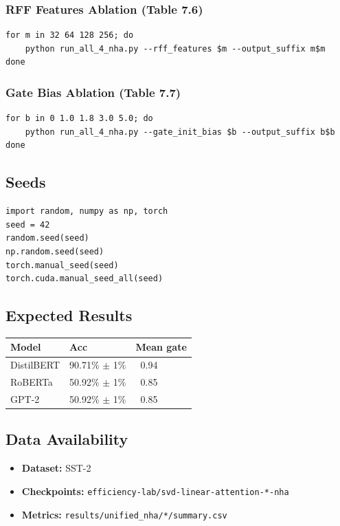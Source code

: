 \subsubsection{RFF Features Ablation (Table 7.6)}
\begin{lstlisting}
for m in 32 64 128 256; do
    python run_all_4_nha.py --rff_features $m --output_suffix m$m
done
\end{lstlisting}

\subsubsection{Gate Bias Ablation (Table 7.7)}
\begin{lstlisting}
for b in 0 1.0 1.8 3.0 5.0; do
    python run_all_4_nha.py --gate_init_bias $b --output_suffix b$b
done
\end{lstlisting}

\subsection{Seeds}

\begin{lstlisting}
import random, numpy as np, torch
seed = 42
random.seed(seed)
np.random.seed(seed)
torch.manual_seed(seed)
torch.cuda.manual_seed_all(seed)
\end{lstlisting}

\subsection{Expected Results}

\begin{table}[H]
\centering
\small
\begin{tabular}{lll}
\toprule
\textbf{Model} & \textbf{Acc} & \textbf{Mean gate} \\
\midrule
DistilBERT & 90.71\% $\pm$ 1\% & ~0.94 \\
RoBERTa & 50.92\% $\pm$ 1\% & ~0.85 \\
GPT-2 & 50.92\% $\pm$ 1\% & ~0.85 \\
\bottomrule
\end{tabular}
\end{table}

\subsection{Data Availability}

\begin{itemize}
\item \textbf{Dataset:} SST-2
\item \textbf{Checkpoints:} \texttt{efficiency-lab/svd-linear-attention-*-nha}
\item \textbf{Metrics:} \texttt{results/unified\_nha/*/summary.csv}

\end{itemize}

